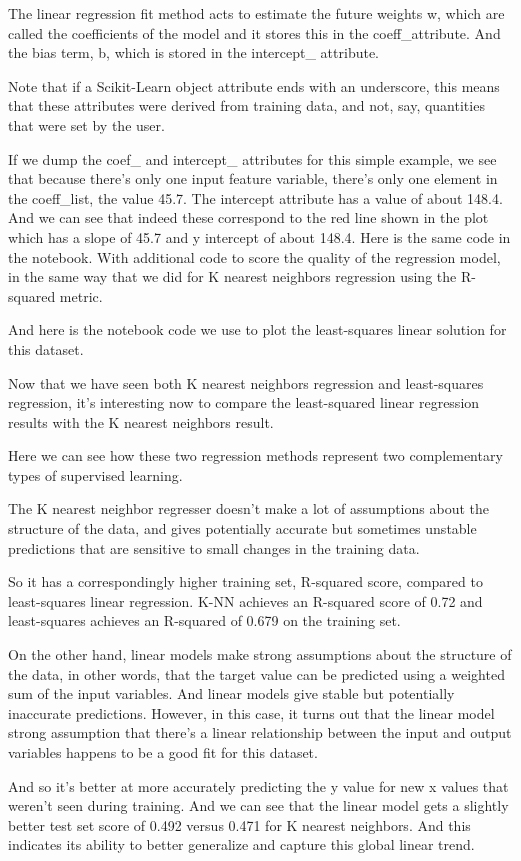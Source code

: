 \begin{multicols}{2}
The linear regression fit method acts to estimate the future weights w, which are called the coefficients of the model and it stores this in the coeff_attribute. And the bias term, b, which is stored in the intercept_ attribute. 

Note that if a Scikit-Learn object attribute ends with an underscore, this means that these attributes were derived from training data, and not, say, quantities that were set by the user. 

If we dump the coef_ and intercept_ attributes for this simple example, we see that because there's only one input feature variable, there's only one element in the coeff_list, the value 45.7. The intercept attribute has a value of about 148.4. And we can see that indeed these correspond to the red line shown in the plot which has a slope of 45.7 and y intercept of about 148.4. Here is the same code in the notebook. With additional code to score the quality of the regression model, in the same way that we did for K nearest neighbors regression using the R-squared metric. 

And here is the notebook code we use to plot the least-squares linear solution for this dataset. 

Now that we have seen both K nearest neighbors regression and least-squares regression, it's interesting now to compare the least-squared linear regression results with the K nearest neighbors result. 

Here we can see how these two regression methods represent two complementary types of supervised learning. 

The K nearest neighbor regresser doesn't make a lot of assumptions about the structure of the data, and gives potentially accurate but sometimes unstable predictions that are sensitive to small changes in the training data. 

So it has a correspondingly higher training set, R-squared score, compared to least-squares linear regression. K-NN achieves an R-squared score of 0.72 and least-squares achieves an R-squared of 0.679 on the training set. 

On the other hand, linear models make strong assumptions about the structure of the data, in other words, that the target value can be predicted using a weighted sum of the input variables. And linear models give stable but potentially inaccurate predictions. However, in this case, it turns out that the linear model strong assumption that there's a linear relationship between the input and output variables happens to be a good fit for this dataset. 

And so it's better at more accurately predicting the y value for new x values that weren't seen during training. And we can see that the linear model gets a slightly better test set score of 0.492 versus 0.471 for K nearest neighbors. And this indicates its ability to better generalize and capture this global linear trend. 

\end{multicols}